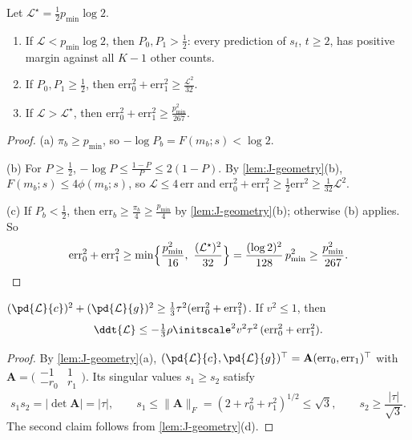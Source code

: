 \begin{lemma}
\label{lem:J-levels}
Let $\mathcal L^\star=\frac{1}{2}p_{\min}\log2$.
\begin{enumerate}[label=(\alph*),leftmargin=*,itemsep=2pt,topsep=3pt]
\item If $\mathcal L<p_{\min}\log2$, then $P_0,P_1>\frac{1}{2}$: every prediction of $s_t$, $t\ge2$, has positive margin against all $K-1$ other counts.
\item If $P_0,P_1\ge\frac{1}{2}$, then $\mathrm{err}_0^2+\mathrm{err}_1^2\ge \frac{\mathcal L^2}{32}$.
\item If $\mathcal L>\mathcal L^\star$, then $\mathrm{err}_0^2+\mathrm{err}_1^2\ge \frac{p_{\min}^2}{267}$.
\end{enumerate}
\end{lemma}

\begin{proof}
(a) $\pi_b\ge p_{\min}$, so $-\log P_b=F(m_b;s)<\log2$.

(b) For $P\ge\frac{1}{2}$, $-\log P\le\frac{1-P}{P}\le2(1-P)$. By \cref{lem:J-geometry}(b), $F(m_b;s)\le4\phi(m_b;s)$, so $\mathcal L\le4\,\mathrm{err}$ and
$\mathrm{err}_0^2+\mathrm{err}_1^2\ge\frac{1}{2}\mathrm{err}^2\ge\frac{1}{32}\mathcal L^2$.

(c) If $P_b<\frac{1}{2}$, then $\mathrm{err}_b\ge\frac{\pi_b}{4}\ge\frac{p_{\min}}{4}$ by \cref{lem:J-geometry}(b); otherwise (b) applies. So
\[
 \mathrm{err}_0^2+\mathrm{err}_1^2\ge\min\Bigl\{\frac{p_{\min}^2}{16},\ \frac{(\mathcal L^\star)^2}{32}\Bigr\}=\frac{(\log2)^2}{128}\,p_{\min}^2\ge\frac{p_{\min}^2}{267}.
\qedhere
\]
\end{proof}

\begin{lemma}
\label{lem:J-gradient}
$(\pd{\mathcal L}{c})^2+(\pd{\mathcal L}{g})^2\ge\frac{1}{3}\tau^2(\mathrm{err}_0^2+\mathrm{err}_1^2)$. If $v^2\le1$, then
\[
 \ddt{\mathcal L}\le-\tfrac{1}{3}\rho\initscale^2v^2\tau^2\,(\mathrm{err}_0^2+\mathrm{err}_1^2).
\]
\end{lemma}

\begin{proof}
By \cref{lem:J-geometry}(a), $(\pd{\mathcal L}{c},\pd{\mathcal L}{g})^\top=\mathbf A(\mathrm{err}_0,\mathrm{err}_1)^\top$ with $\mathbf A=\bigl(\begin{smallmatrix}-1&1\\-r_0&r_1\end{smallmatrix}\bigr)$. Its singular values $s_1\ge s_2$
satisfy
\[
 s_1s_2=|\det\mathbf A|=|\tau|,\qquad s_1\le\|\mathbf A\|_F=(2+r_0^2+r_1^2)^{1/2}\le\sqrt3,\qquad s_2\ge\frac{|\tau|}{\sqrt3} .
\]
The second claim follows from \cref{lem:J-geometry}(d).
\end{proof}

